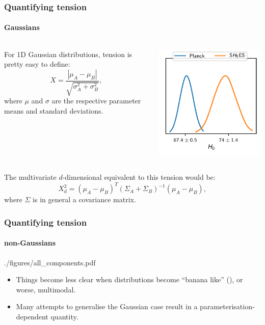 \documentclass[%
]{beamer}
\begin{document}
\begin{frame}
    \frametitle{Quantifying tension}
    \framesubtitle{Gaussians}
    \begin{columns}
        \begin{column}{0.5\textwidth}
            For 1D Gaussian distributions, tension is pretty easy to define:
            \[
                X = \frac{|\mu_A - \mu_B|}{\sqrt{\sigma_A^2 + \sigma_B^2}},
            \]
         where $\mu$ and $\sigma$ are the respective parameter means and standard deviations.
        \end{column}
        \begin{column}{0.5\textwidth}
            \begin{overlayarea}{\textwidth}{0.65\textheight}
                \includegraphics{./plots/H0.pdf}
            \end{overlayarea}
        \end{column}
    \end{columns}

    The multivariate $d$-dimensional equivalent to this tension would be:
    \[
        X^2_d = {(\mu_A - \mu_B)}^T{(\Sigma_A + \Sigma_B)}^{-1}(\mu_A-\mu_B),
    \]
    where $\Sigma$ is in general a covariance matrix.
\end{frame}

\begin{frame}
    \frametitle{Quantifying tension}
    \framesubtitle{non-Gaussians}
    \begin{figright}[0.4]{./figures/all_components.pdf}
        \begin{itemize}
            \item Things become less clear when distributions become ``banana like'' (),
        or worse, multimodal.
        \end{itemize}
    \end{figright}
    \begin{itemize}
        \item Many attempts to generalise the Gaussian case result in a parameterisation-dependent quantity.
    \end{itemize}
\end{frame}
\end{document}
